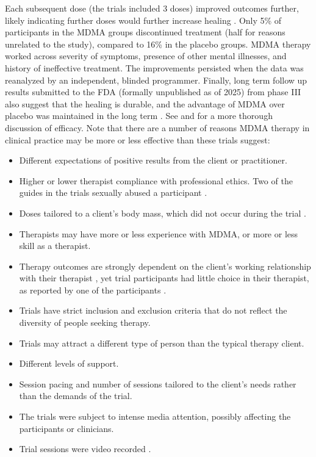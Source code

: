 \documentclass[12pt,letterpaper]{book}
\begin{document}
Each subsequent dose (the trials included 3 doses) improved outcomes further, likely indicating further doses would further increase healing \cite{mitchellMDMAClinicalTrial,mitchellMDMAClinicalTrial2}. Only 5\% of participants in the MDMA groups discontinued treatment (half for reasons unrelated to the study), compared to 16\% in the placebo groups. MDMA therapy worked across severity of symptoms, presence of other mental illnesses, and history of ineffective treatment. The improvements persisted when the data was reanalyzed by an independent, blinded programmer. Finally, long term follow up results submitted to the FDA (formally unpublished as of 2025) from phase III also suggest that the healing is durable, and the advantage of MDMA over placebo was maintained in the long term \cite{mplongPreliminary}. See \textcite{wolfgang2025} and \textcite{icerReport} for a more thorough discussion of efficacy. Note that there are a number of reasons MDMA therapy in clinical practice may be more or less effective than these trials suggest:
\begin{itemize}
    \item Different expectations of positive results from the client or practitioner.
    \item Higher or lower therapist compliance with professional ethics. Two of the guides in the trials sexually abused a participant \cite{powerTrip}.
    \item Doses tailored to a client's body mass, which did not occur during the trial \cite{mitchellMDMAClinicalTrial}.
    \item Therapists may have more or less experience with MDMA, or more or less skill as a therapist.
    \item Therapy outcomes are strongly dependent on the client's working relationship with their therapist \cite{BRWAIdownload}, yet trial participants had little choice in their therapist, as reported by one of the participants \cite{kacandaNoChoice}.
    \item Trials have strict inclusion and exclusion criteria that do not reflect the diversity of people seeking therapy.
    \item Trials may attract a different type of person than the typical therapy client.
    \item Different levels of support.
    \item Session pacing and number of sessions tailored to the client's needs rather than the demands of the trial.
    \item The trials were subject to intense media attention, possibly affecting the participants or clinicians.
    \item Trial sessions were video recorded \cite{mitchellMDMAClinicalTrial}.
\end{itemize}
\end{document}
